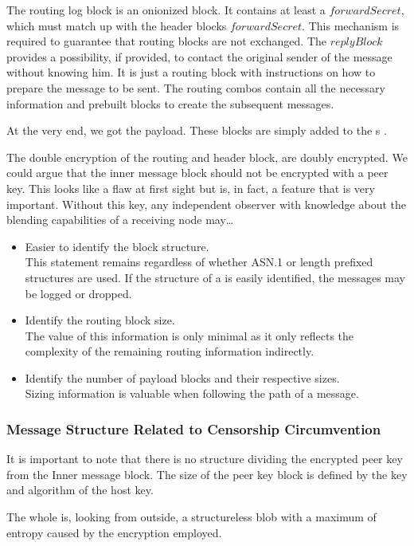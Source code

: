 The routing log block is an onionized block. It contains at least a $forwardSecret$, which must match up with the header blocks $forwardSecret$. This mechanism is required to guarantee that routing blocks are not exchanged. The $replyBlock$ provides a possibility, if provided, to contact the original sender of the message without knowing him. It is just a routing block with instructions on how to prepare the message to be sent. The routing combos contain all the necessary information and prebuilt blocks to create the subsequent messages.

At the very end, we got the payload. These blocks are simply added to the s .

The double encryption of the routing and header block, are doubly encrypted. We could argue that the inner message block should not be encrypted with a peer key. This looks like a flaw at first sight but is, in fact, a feature that is very important. Without this key, any independent observer with knowledge about the blending capabilities of a receiving node may\ldots
\begin{itemize}
	\item Easier to identify the block structure.\\ 
	This statement remains regardless of whether ASN.1 or length prefixed structures are used. If the structure of a \VortexMessage is easily identified, the messages may be logged or dropped.
	\item Identify the routing block size.\\
	The value of this information is only minimal as it only reflects the complexity of the remaining routing information indirectly.
	\item Identify the number of payload blocks and their respective sizes. \\
	Sizing information is valuable when following the path of a message.
\end{itemize}

\subsubsection{Message Structure Related to Censorship Circumvention}
It is important to note that there is no structure dividing the encrypted peer key from the Inner message block. The size of the peer key block is defined by the key and algorithm of the host key. 

The whole \VortexMessage is, looking from outside, a structureless blob with a maximum of entropy caused by the encryption employed. 

